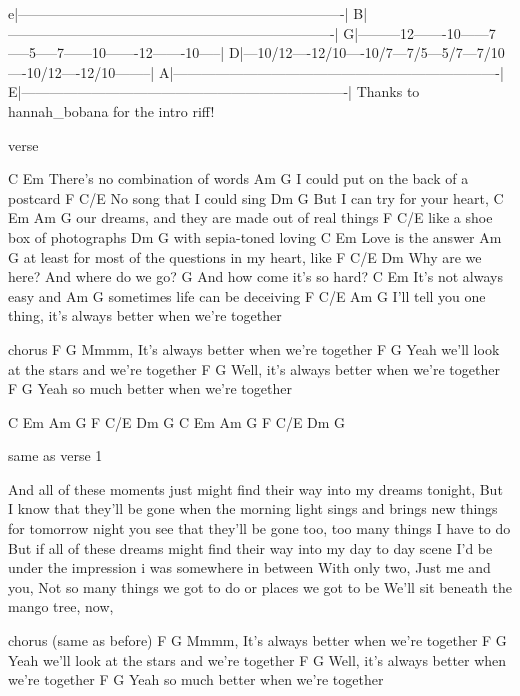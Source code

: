 e|----------------------------------------------------------------------|
B|----------------------------------------------------------------------|
G|---------12-------10------7-----5-----7------10-------12-------10-----|
D|---10/12----12/10----10/7---7/5---5/7---7/10----10/12----12/10--------|
A|----------------------------------------------------------------------|
E|----------------------------------------------------------------------|
Thanks to hannah_bobana for the intro riff!

verse

C                     Em             
There's no combination of words
         Am                      G
I could put on the back of a postcard
F              C/E
No song that I could sing
       Dm            G
But I can try for your heart,
C       Em                Am                 G 
our dreams, and they are made out of real things
        F               C/E
like a shoe box of photographs
          Dm         G
with sepia-toned loving
C              Em
Love is the answer
              Am                        G
at least for most of the questions in my heart, like
F             C/E                 Dm 
Why are we here? And where do we go?
                   G
And how come it's so hard?
C                 Em
It's not always easy and
            Am               G
sometimes life can be deceiving
F                    C/E               Am                   G
I'll tell you one thing, it's always better when we're together


chorus
F                   G
Mmmm, It's always better when we're together
F                       G
Yeah we'll look at the stars and we're together
F                   G
Well, it's always better when we're together
F               G
Yeah so much better when we're together


C Em Am G F C/E Dm G
C Em Am G F C/E Dm G 



same as verse 1

And all of these moments
just might find their way into my dreams tonight,
But I know that they’ll be gone
when the morning light sings
and brings new things
for tomorrow night you see
that they’ll be gone too,
too many things I have to do
But if all of these dreams might find their way
into my day to day scene
I'd be under the impression
i was somewhere in between
With only two,
Just me and you,
Not so many things we got to do
or places we got to be
We'll sit beneath the mango tree, now,


chorus (same as before)
F                   G
Mmmm, It's always better when we're together
F                       G
Yeah we'll look at the stars and we're together
F                   G
Well, it's always better when we're together
F               G
Yeah so much better when we're together


